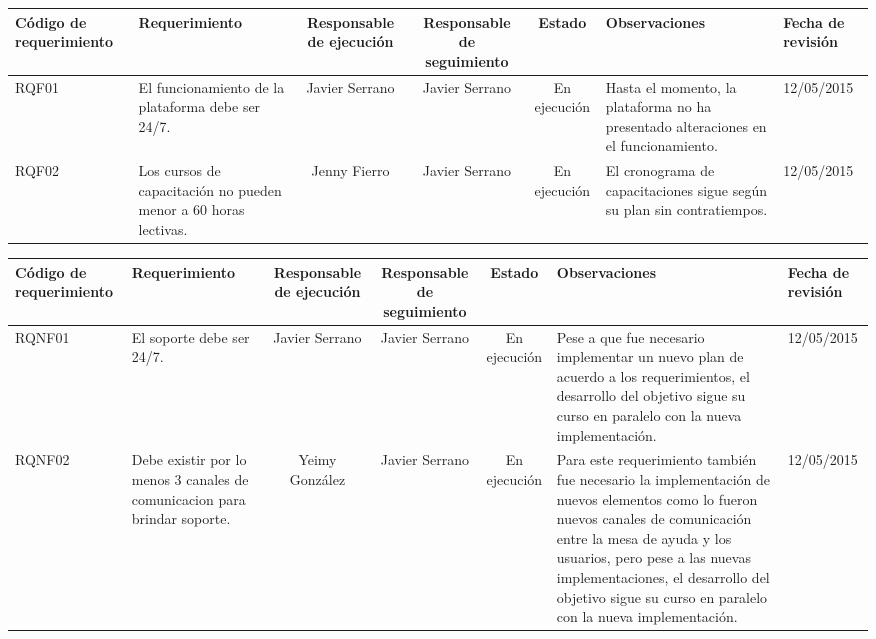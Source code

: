 %
\begin{table}[H]
	\centering
	\begin{tabular}{| p{2.4cm} | p{2.5cm} | c | c | c | p{3cm} | p{1.7cm} |}
	\hline
	\rowcolor{LightGrey}
	\textbf{C\'odigo de requerimiento} & \textbf{Requerimiento} & \textbf{Responsable de ejecuci\'on} & 
		\textbf{Responsable de seguimiento} & \textbf{Estado} & \textbf{Observaciones} & 
		\textbf{Fecha de revisi\'on} \\
	\hline
	RQF01 & El funcionamiento de la plataforma debe ser 24/7. & Javier Serrano & Javier Serrano & En ejecuci\'on 
	& Hasta el momento, la plataforma no ha presentado alteraciones en el funcionamiento. & 12/05/2015\\
	\hline
	RQF02 & Los cursos de capacitaci\'on no pueden menor a 60 horas lectivas. & Jenny Fierro & Javier Serrano 
	& En ejecuci\'on & El cronograma de capacitaciones sigue seg\'un su plan sin contratiempos. & 12/05/2015\\
	\hline
	\end{tabular}
\end{table}
%
\begin{table}[H]
	\centering
	\begin{tabular}{| p{2.4cm} | p{2.5cm} | c | c | c | p{3cm} | p{1.7cm} |}
	\hline
	\rowcolor{LightGrey}
	\textbf{C\'odigo de requerimiento} & \textbf{Requerimiento} & \textbf{Responsable de ejecuci\'on} & 
		\textbf{Responsable de seguimiento} & \textbf{Estado} & \textbf{Observaciones} & 
		\textbf{Fecha de revisi\'on} \\
	\hline
	RQNF01 & El soporte debe ser 24/7. & Javier Serrano & Javier Serrano 
	& En ejecuci\'on & Pese a que fue necesario implementar un nuevo plan de acuerdo a los requerimientos, el 
	desarrollo del objetivo sigue su curso en paralelo con la nueva implementaci\'on. & 12/05/2015\\
	\hline
	RQNF02 & Debe existir por lo menos 3 canales de comunicacion para brindar soporte. & Yeimy Gonz\'alez 
	& Javier Serrano & En ejecuci\'on & Para este requerimiento tambi\'en fue necesario la implementaci\'on
	de nuevos elementos como lo fueron nuevos canales de comunicaci\'on entre la mesa de ayuda y los usuarios, 
	pero pese a las nuevas implementaciones, el desarrollo del objetivo sigue su curso en paralelo con la nueva 
	implementaci\'on. & 12/05/2015\\
	\hline
	\end{tabular}
\end{table}
%